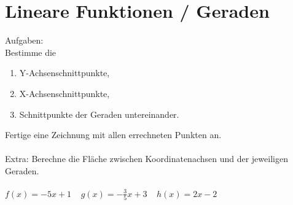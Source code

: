 


      \section*{Lineare Funktionen / Geraden}
      Aufgaben:\\ Bestimme die
      \begin{enumerate}
            \item Y-Achsenschnittpunkte,
            \item X-Achsenschnittpunkte,
            \item Schnittpunkte der Geraden untereinander.
      \end{enumerate}
      Fertige eine Zeichnung mit allen errechneten Punkten an.\\\\
      Extra: Berechne die Fläche zwischen Koordinatenachsen und der jeweiligen Geraden.
      \\\\
      $f(x)=-5x+1 \;\;\;\; g(x)=-\frac{3}{5}x+3 \;\;\;\; h(x)=2x-2$

